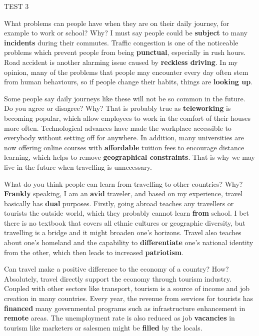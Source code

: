 \begin{glossarymc}[Cambridge 9]
\begin{test}{TEST 3}
    \begin{qa}{What problems can people have when they are on their daily journey, for example to work or school? Why?}
    I must say people could be \textbf{subject} to many \textbf{incidents} during their commutes. Traffic congestion is one of the noticeable problems which prevent people from being \textbf{punctual}, especially in rush hours. Road accident is another alarming issue caused by \textbf{reckless driving}. In my opinion, many of the problems that people may encounter every day often stem from human behaviours, so if people change their habits, things are \textbf{looking up}.
    \end{qa}

    \begin{qa}{Some people say daily journeys like these will not be so common in the future. Do you agree or disagree? Why?}
    That is probably true as \textbf{teleworking} is becoming popular, which allow employees to work in the comfort of their houses more often. Technological advances have made the workplace accessible to everybody without setting off for anywhere. In addition, many universities are now offering online courses with \textbf{affordable} tuition fees to encourage distance learning, which helps to remove \textbf{geographical constraints}. That is why we may live in the future when travelling is unnecessary.
    \end{qa}

    \begin{qa}{What do you think people can learn from travelling to other countries? Why?}
    \textbf{Frankly} speaking, I am an \textbf{avid} traveler, and based on my experience, travel basically has \textbf{dual} purposes. Firstly, going abroad teaches any travellers or tourists the outside world, which they probably cannot learn \textbf{from} school. I bet there is no textbook that covers all ethnic cultures or geographic diversity, but travelling is a bridge and it might broaden one's horizons. Travel also teaches about one's homeland and the capability to \textbf{differentiate} one's national identity from the other, which then leads to increased \textbf{patriotism}.
    \end{qa}

    \begin{qa}{Can travel make a positive difference to the economy of a country? How?}
    Absolutely, travel directly support the economy through tourism industry. Coupled with other sectors like transport, tourism is a source of income and job creation in many countries. Every year, the revenue from services for tourists has \textbf{financed} many governmental programs such as infrastructure enhancement in \textbf{remote} areas. The unemployment rate is also reduced as job \textbf{vacancies} in tourism like marketers or salesmen might be \textbf{filled} by the locals.
    \end{qa}


\end{test}
\end{glossarymc}
